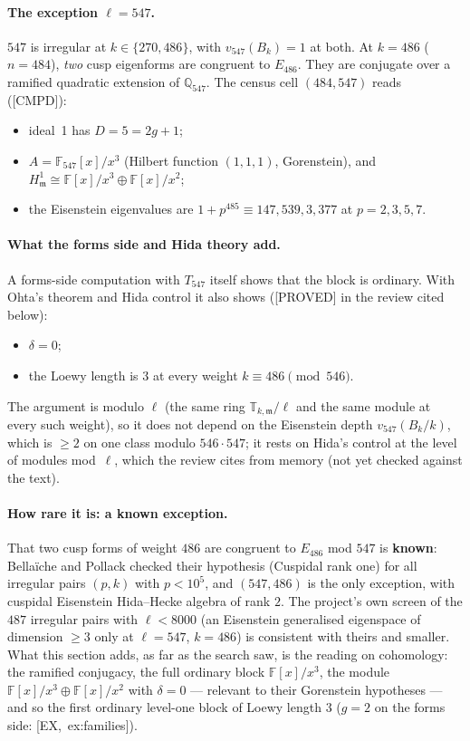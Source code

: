 \documentclass[11pt]{article}
\newcommand{\Q}{\mathbb{Q}}
\newcommand{\F}{\mathbb{F}}
\newcommand{\T}{\mathbb{T}}
\newcommand{\m}{\mathfrak{m}}
\newcommand{\PROVED}{\textsf{\small[PROVED]}}
\newcommand{\CMPD}{\textsf{\small[CMPD]}}
\begin{document}
\paragraph{The exception $\ell=547$.} $547$ is irregular at $k\in\{270,486\}$, with $v_{547}(B_k)=1$ at both. At $k=486$ ($n=484$),
\emph{two} cusp eigenforms are congruent to $E_{486}$. They are conjugate over a ramified quadratic extension of $\Q_{547}$. The census cell
$(484,547)$ reads (\CMPD):
\begin{itemize}[leftmargin=1.6em,itemsep=1pt]
\item ideal~1 has $D=5=2g+1$;
\item $A=\F_{547}[x]/x^{3}$ (Hilbert function $(1,1,1)$, Gorenstein), and $H^{1}_\m\cong\F[x]/x^{3}\oplus\F[x]/x^{2}$;
\item the Eisenstein eigenvalues are $1+p^{485}\equiv147,539,3,377$ at $p=2,3,5,7$.
\end{itemize}

\paragraph{What the forms side and Hida theory add.} A forms-side computation with $T_{547}$ itself shows that the block is ordinary. With
Ohta's theorem and Hida control it also shows (\PROVED{} in the review cited below):
\begin{itemize}[leftmargin=1.6em,itemsep=1pt]
\item $\delta=0$;
\item the Loewy length is $3$ at every weight $k\equiv486\pmod{546}$.
\end{itemize}
The argument is modulo $\ell$ (the same ring $\T_{k,\m}/\ell$ and the same module at every such weight), so it does not depend on the
Eisenstein depth $v_{547}(B_k/k)$, which is $\ge2$ on one class modulo $546\cdot547$; it rests on Hida's control at the level of modules mod~$\ell$,
which the review cites from memory (not yet checked against the text).

\paragraph{How rare it is: a known exception.} That two cusp forms of weight $486$ are congruent to $E_{486}$ mod $547$ is
\textbf{known}: Bella\"iche and Pollack \cite[\S1.1, \S3.9]{ph_bp19} checked their hypothesis (Cuspidal rank one) for all irregular pairs
$(p,k)$ with $p<10^{5}$, and $(547,486)$ is the only exception, with cuspidal Eisenstein Hida--Hecke algebra of rank $2$. The project's own
screen of the $487$ irregular pairs with $\ell<8000$ (an Eisenstein generalised eigenspace of dimension $\ge3$ only at $\ell=547$, $k=486$) is
consistent with theirs and smaller. What this section adds, as far as the search saw, is the reading on cohomology: the ramified conjugacy, the
full ordinary block $\F[x]/x^{3}$, the module $\F[x]/x^{3}\oplus\F[x]/x^{2}$ with $\delta=0$ --- relevant to their Gorenstein hypotheses
\cite[\S1.2]{ph_bp19} --- and so the first ordinary level-one block of Loewy length $3$ ($g=2$ on the forms side: [EX,~ex:families]).
\end{document}
